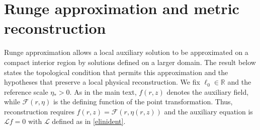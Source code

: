 \documentclass[amsmath,amsfonts,amssymb,aps,pra,superscriptaddress,10pt]{revtex4-2}
\numberwithin{equation}{section}
\theoremstyle{plain}
\theoremstyle{definition}
\theoremstyle{remark}
\theoremstyle{definition}
\newcommand{\ellzero}{\ell_0}
\begin{document}
\section{Runge approximation and metric reconstruction}\label{auxanalysis}

Runge approximation allows a local auxiliary solution to be approximated on a compact interior region by solutions defined on a larger domain. The result below states the topological condition that permits this approximation and the hypotheses that preserve a local physical reconstruction. We fix $\ellzero\in\mathbb{R}$ and the reference scale $\eta_*>0$. As in the main text, $f(r,z)$ denotes the auxiliary field, while $\mathcal{F}(r,\eta)$ is the defining function of the point transformation. Thus, reconstruction requires $f(r,z)=\mathcal{F}(r,\eta(r,z))$ and the auxiliary equation is $\mathcal{L}f=0$ with $\mathcal{L}$ defined as in \eqref{elinident}.
\end{document}
